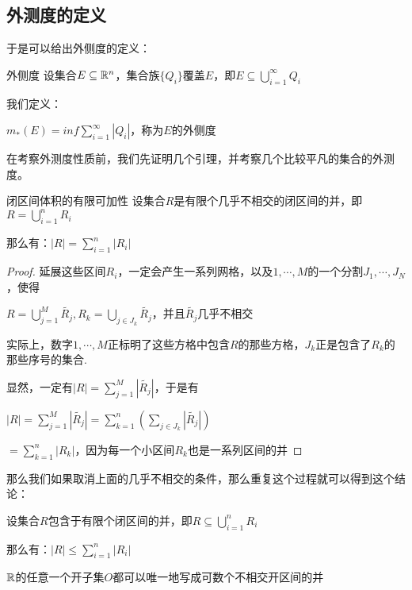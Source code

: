 \documentclass[12pt, a4paper, oneside, UTF8]{ctexbook}
\begin{document}
		\subsection{外测度的定义}
		于是可以给出外侧度的定义：
		\begin{defn}{外侧度}{}
			设集合$E \subseteq \mathbb{R}^n$，集合族$\{Q_i\}$覆盖$E$，即$E \subseteq \bigcup\limits_{i=1}^{\infty} Q_i$
			
			我们定义：
			
			$m_*(E) = inf \sum\limits_{i=1}^{\infty} |Q_i|$，称为$E$的外侧度
		\end{defn}
		在考察外测度性质前，我们先证明几个引理，并考察几个比较平凡的集合的外测度。
		\begin{lemma}{闭区间体积的有限可加性}{}
			设集合$R$是有限个几乎不相交的闭区间的并，即$R = \bigcup\limits_{i=1}^{n} R_i$
			
			那么有：$|R| = \sum\limits_{i=1}^{n} |R_i|$
		\end{lemma}
		\begin{proof}
			延展这些区间$R_i$，一定会产生一系列网格，以及${1,\cdots,M}$的一个分割$J_1,\cdots,J_N$，使得
			
			$R = \bigcup_{j=1}^{M} \tilde{R_j},R_k = \bigcup_{j \in J_k} \tilde{R_j}$，并且$\tilde{R_j}$几乎不相交
			
			实际上，数字$1,\cdots,M$正标明了这些方格中包含$R$的那些方格，$J_k$正是包含了$R_k$的那些序号的集合.
			
			显然，一定有$|R|=\sum\limits_{j=1}^{M} |\tilde{R_j}|$，于是有
			
			$|R| = \sum\limits_{j=1}^{M} |\tilde{R_j}| = \sum\limits_{k=1}^{n} \left(\sum\limits_{j \in J_k} |\tilde{R_j}|\right)$
			
			$=\sum\limits_{k=1}^{n} |R_k|$，因为每一个小区间$R_k$也是一系列区间的并
		\end{proof}
		那么我们如果取消上面的几乎不相交的条件，那么重复这个过程就可以得到这个结论：
		\begin{corollary}{}{}
			设集合$R$包含于有限个闭区间的并，即$R  \subseteq \bigcup\limits_{i=1}^{n} R_i$
			
			那么有：$|R| \leqslant \sum\limits_{i=1}^{n} |R_i|$
		\end{corollary}
		\begin{them}{}{}
			$\mathbb{R}$的任意一个开子集$O$都可以唯一地写成可数个不相交开区间的并
		\end{them}
\end{document}

